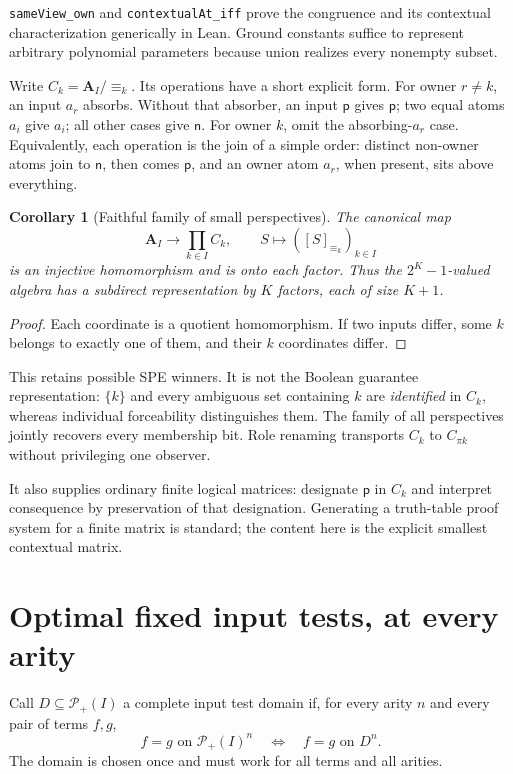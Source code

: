 \documentclass[11pt]{article}
\newtheorem{corollary}[theorem]{Corollary}
\newcommand{\A}{\mathbf A_I}
\newcommand{\Pow}{\mathcal P_+}
\newcommand{\pv}{\mathsf p}
\newcommand{\nv}{\mathsf n}
\begin{document}
\texttt{sameView\_own} and \texttt{contextualAt\_iff} prove the
congruence and its contextual characterization generically in Lean.
Ground constants suffice to represent arbitrary polynomial parameters
because union realizes every nonempty subset.

Write $C_k=\A/{\equiv_k}$. Its operations have a short explicit form.
For owner $r\ne k$, an input $a_r$ absorbs. Without that absorber, an
input $\pv$ gives $\pv$; two equal atoms $a_i$ give $a_i$; all other
cases give $\nv$. For owner $k$, omit the absorbing-$a_r$ case.
Equivalently, each operation is the join of a simple order: distinct
non-owner atoms join to $\nv$, then comes $\pv$, and an owner atom
$a_r$, when present, sits above everything.

\begin{corollary}[Faithful family of small perspectives]\label{cor:product}
The canonical map
\[
 \A\longrightarrow\prod_{k\in I} C_k,\qquad
 S\longmapsto([S]_{\equiv_k})_{k\in I}
\]
is an injective homomorphism and is onto each factor. Thus the
$2^K-1$-valued algebra has a subdirect representation by $K$ factors,
each of size $K+1$.
\end{corollary}
\begin{proof}
Each coordinate is a quotient homomorphism. If two inputs differ, some
$k$ belongs to exactly one of them, and their $k$ coordinates differ.
\end{proof}

This retains possible SPE winners. It is not the Boolean guarantee
representation: $\{k\}$ and every ambiguous set containing $k$ are
\emph{identified} in $C_k$, whereas individual forceability distinguishes
them. The family of all perspectives jointly recovers every membership
bit. Role renaming transports $C_k$ to $C_{\pi k}$ without privileging
one observer.

It also supplies ordinary finite logical matrices: designate $\pv$ in
$C_k$ and interpret consequence by preservation of that designation.
Generating a truth-table proof system for a finite matrix is standard;
the content here is the explicit smallest contextual matrix.

\section{Optimal fixed input tests, at every arity}

Call $D\subseteq\Pow(I)$ a complete input test domain if, for every arity
$n$ and every pair of terms $f,g$,
\[
 f=g\text{ on }\Pow(I)^n\quad\Longleftrightarrow\quad f=g\text{ on }D^n.
\]
The domain is chosen once and must work for all terms and all arities.
\end{document}
